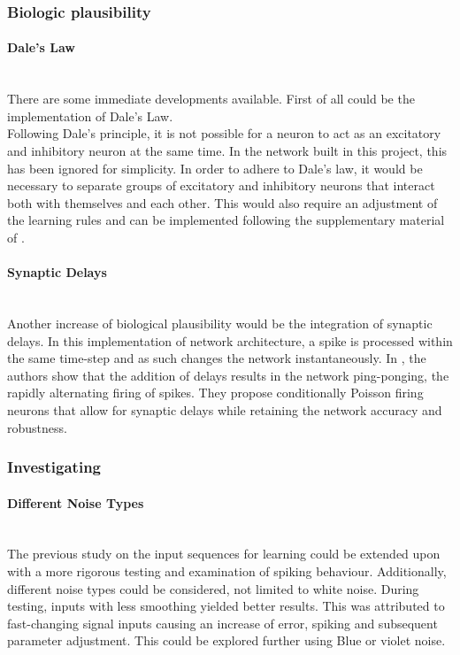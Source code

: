 \subsubsection{Biologic plausibility}
\paragraph{Dale's Law}\mbox{}\\
There are some immediate developments available. First of all could be the implementation of Dale's Law.\\
Following Dale's principle, it is not possible for a neuron to act as an excitatory and inhibitory neuron at the same time. In the network built in this project, this has been ignored for simplicity. In order to adhere to Dale's law, it would be necessary to separate groups of excitatory and inhibitory neurons that interact both with themselves and each other. This would also require an adjustment of the learning rules and can be implemented following the supplementary material of \cite{brendel_learning_2020}.\\
\paragraph{Synaptic Delays}\mbox{}\\
Another increase of biological plausibility would be the integration of synaptic delays. In this implementation of network architecture, a spike is processed within the same time-step and as such changes the network instantaneously.  In \cite{rullan_buxo_poisson_2020}, the authors show that the addition of delays results in the network ping-ponging, the rapidly alternating firing of spikes. They propose conditionally Poisson firing neurons that allow for synaptic delays while retaining the network accuracy and robustness.\\

\subsubsection{Investigating}
\paragraph{Different Noise Types}\mbox{}\\
The previous study on the input sequences for learning could be extended upon with a more rigorous testing and examination of spiking behaviour. Additionally, different noise types could be considered, not limited to white noise. During testing, inputs with less smoothing yielded better results. This was attributed to fast-changing signal inputs causing an increase of error, spiking and subsequent parameter adjustment. This could be explored further using Blue or violet noise.
